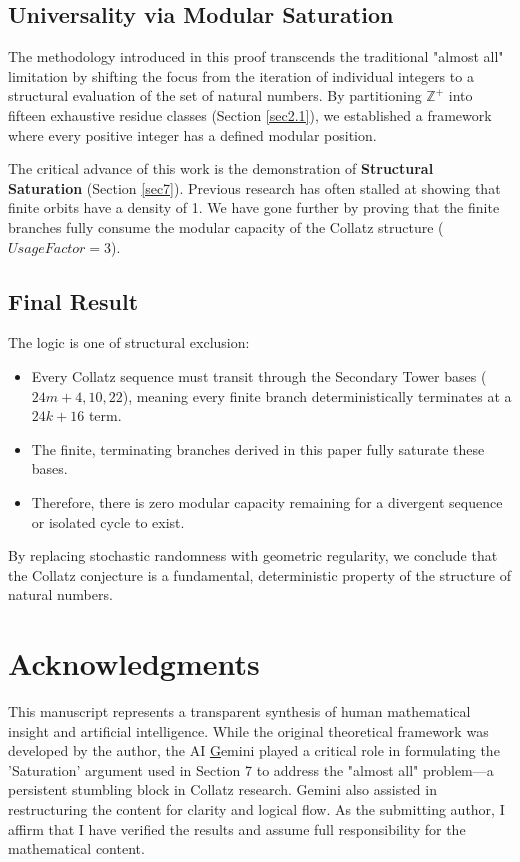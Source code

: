 \documentclass[sn-mathphys-num, pdflatex]{sn-jnl}
\begin{document}
\subsection{Universality via Modular Saturation}
The methodology introduced in this proof transcends the traditional "almost all" limitation by shifting the focus from the iteration of individual integers to a structural evaluation of the set of natural numbers. By partitioning $\mathbb{Z}^{+}$ into fifteen exhaustive residue classes (Section \ref{sec2.1}), we established a framework where every positive integer has a defined modular position.

The critical advance of this work is the demonstration of \textbf{Structural Saturation} (Section \ref{sec7}). Previous research has often stalled at showing that finite orbits have a density of 1. We have gone further by proving that the finite branches fully consume the modular capacity of the Collatz structure ($Usage Factor = 3$).

\subsection{Final Result}
The logic is one of structural exclusion:
\begin{itemize}
    \item Every Collatz sequence must transit through the Secondary Tower bases ($24m+4, 10, 22$), meaning every finite branch deterministically terminates at a $24k+16$ term.
    \item The finite, terminating branches derived in this paper fully saturate these bases.
    \item Therefore, there is zero modular capacity remaining for a divergent sequence or isolated cycle to exist.
\end{itemize}

By replacing stochastic randomness with geometric regularity, we conclude that the Collatz conjecture is a fundamental, deterministic property of the structure of natural numbers.

\section*{Acknowledgments}
This manuscript represents a transparent synthesis of human mathematical insight and artificial intelligence. While the original theoretical framework was developed by the author, the AI \href{https://deepmind.google/technologies/gemini/}Gemini played a critical role in formulating the 'Saturation' argument used in Section 7 to address the "almost all" problem—a persistent stumbling block in Collatz research. Gemini also assisted in restructuring the content for clarity and logical flow. As the submitting author, I affirm that I have verified the results and assume full responsibility for the mathematical content.
\end{document}
